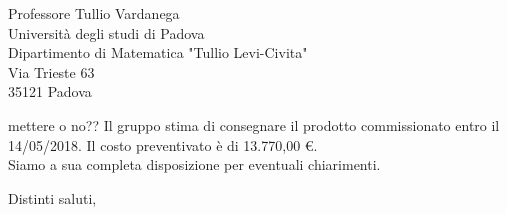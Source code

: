 \documentclass[12pt]{letter} %
\begin{document}
\begin{letter}{Professore Tullio Vardanega \\ Università degli studi di Padova \\ Dipartimento di Matematica "Tullio Levi-Civita" \\ Via Trieste 63 \\ 35121 Padova}
\begin{addmargin}[2em]{2em}
mettere o no??
Il gruppo stima di consegnare il prodotto commissionato entro il 14/05/2018. Il costo preventivato è di 13.770,00 \euro. \\ Siamo a sua completa disposizione per eventuali chiarimenti.
  
\end{addmargin}




\closing{Distinti saluti,}




\end{letter}
 
\end{document}
